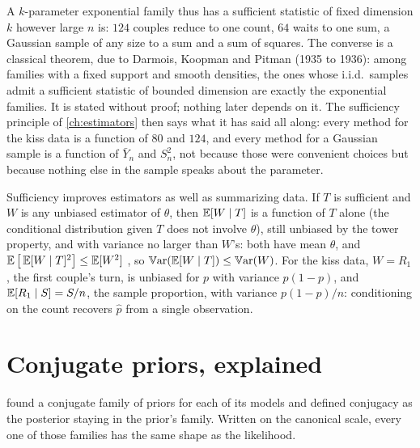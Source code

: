A $k$-parameter exponential family thus has a sufficient statistic of fixed dimension $k$ however large $n$ is: $124$ couples reduce to one count, $64$ waits to one sum, a Gaussian sample of any size to a sum and a sum of squares.
The converse is a classical theorem, due to Darmois, Koopman and Pitman (1935 to 1936): among families with a fixed support and smooth densities, the ones whose i.i.d.\ samples admit a sufficient statistic of bounded dimension are exactly the exponential families.
It is stated without proof; nothing later depends on it.
The sufficiency principle of \cref{ch:estimators} then says what it has said all along: every method for the kiss data is a function of $80$ and $124$, and every method for a Gaussian sample is a function of $\bar{Y}_n$ and $S_n^2$, not because those were convenient choices but because nothing else in the sample speaks about the parameter.

\begin{remark}
Sufficiency improves estimators as well as summarizing data.
If $T$ is sufficient and $W$ is any unbiased estimator of $\theta$, then $\operatorname*{\mathbb{E}}[W \mid T]$ is a function of $T$ alone (the conditional distribution given $T$ does not involve $\theta$), still unbiased by the tower property, and with variance no larger than $W$'s: both have mean $\theta$, and $\operatorname*{\mathbb{E}}\big[\operatorname*{\mathbb{E}}[W \mid T]^2\big] \leq \operatorname*{\mathbb{E}}[W^2]$ , so $\operatorname*{\mathbb{V}\text{ar}}(\operatorname*{\mathbb{E}}[W \mid T]) \leq \operatorname*{\mathbb{V}\text{ar}}(W)$.
For the kiss data, $W = R_1$, the first couple's turn, is unbiased for $p$ with variance $p(1 - p)$, and $\operatorname*{\mathbb{E}}[R_1 \mid S] = S/n$, the sample proportion, with variance $p(1 - p)/n$: conditioning on the count recovers $\hat{p}$ from a single observation.
\end{remark}

\section{Conjugate priors, explained}
\label{sec:ef-conjugate}

 found a conjugate family of priors for each of its models and defined conjugacy as the posterior staying in the prior's family.
Written on the canonical scale, every one of those families has the same shape as the likelihood.

